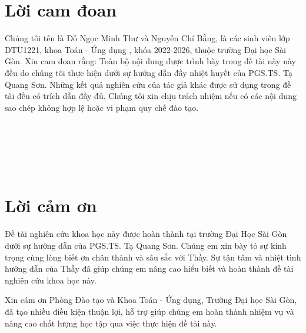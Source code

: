 \documentclass[12pt,a4paper]{report}
\begin{document}
	\renewcommand{\baselinestretch}{1.2}
	\fontsize{13pt}{20pt}\selectfont
	
    \chapter*{Lời cam đoan}
	\thispagestyle{fancy}
	\vspace{1cm}
	\indent
	
	Chúng tôi tên là Đỗ Ngọc Minh Thư và Nguyễn Chí Bằng, là các  sinh viên lớp DTU1221, khoa Toán - Ứng dụng , khóa 2022-2026,  thuộc trường Đại học Sài Gòn. 
	Xin cam đoan rằng: Toàn bộ nội dung được trình bày trong đề tài  này này đều do chúng tôi thực hiện dưới sự hướng dẫn đầy nhiệt huyết của PGS.TS. Tạ Quang Sơn.
	Những kết quả nghiên cứu của tác giả khác được sử dụng trong đề tài  đều có trích dẫn đầy đủ. 
	Chúng tôi xin chịu trách nhiệm nếu có các nội dung sao chép không hợp lệ hoặc vi phạm quy chế đào tạo. 
	\\
	\\
	\\
	\\
	\\
	\\
	
	
	\chapter*{Lời cảm ơn}
	\thispagestyle{fancy}
	\vspace{1cm}
	\indent
	
	Đề tài nghiên cứu khoa học này được hoàn thành tại trường Đại Học Sài Gòn dưới sự hướng dẫn của PGS.TS. Tạ Quang Sơn. Chúng em xin bày tỏ sự kính trọng cùng lòng biết ơn chân thành và sâu sắc với Thầy. Sự tận tâm và nhiệt tình hướng dẫn của Thầy đã giúp chúng em nâng cao hiểu biết và hoàn thành đề tài nghiên cứu khoa học này.
	
	
	\bigskip
	Xin cám ơn Phòng Đào tạo  và Khoa Toán - Ứng dụng, Trường Đại học Sài Gòn, đã tạo nhiều điều kiện thuận lợi, hỗ trợ giúp chúng em hoàn thành nhiệm vụ và nâng cao chất lượng học tập qua việc thực hiện đề tài này.
	\\
	\\
	\\
	\\
	\\
	
\end{document}
